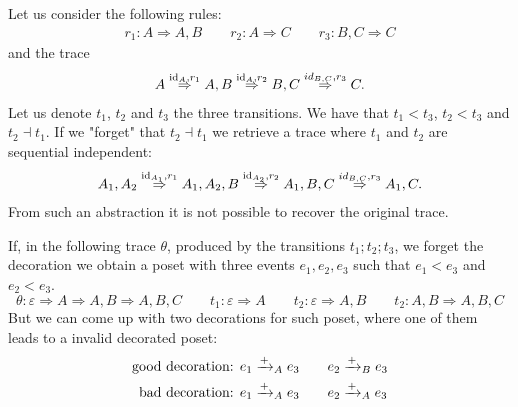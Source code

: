 \begin{example}
  Let us consider the following rules:
  \begin{align*}
    r_1:A \Rightarrow A, B\qquad r_2:A \Rightarrow C \qquad r_3: B,C \Rightarrow C
  \end{align*}
  and the trace
  \begin{align*}
    A \overset{\text{id}_A,r_1}{\Rightarrow} A, B \overset{\text{id}_A,r_2}{\Rightarrow} B,C \overset{id_{B,C},r_3}{\Rightarrow}C.
  \end{align*}
  Let us denote $t_1$, $t_2$ and $t_3$ the three transitions. We have that $t_1<t_3$, $t_2<t_3$ and $t_2\dashv t_1$. If we "forget" that $t_2\dashv t_1$ we retrieve a trace where $t_1$ and $t_2$ are sequential independent:
  \begin{align*}
    A_1,A_2 \overset{\text{id}_{A_1},r_1}{\Rightarrow} A_1,A_2,B \overset{\text{id}_{A_2},r_2}{\Rightarrow} A_1,B,C \overset{id_{B,C},r_3}{\Rightarrow} A_1,C.
  \end{align*}
  From such an abstraction it is not possible to recover the original trace.
\end{example}


\begin{example}
  If, in the following trace $\theta$, produced by the transitions $t_1;t_2;t_3$, we forget the decoration we obtain a poset with three events $e_1,e_2,e_3$ such that $e_1<e_3$ and $e_2<e_3$.
  \[
  \theta:\varepsilon \Rightarrow A \Rightarrow A,B\Rightarrow A,B,C\qquad t_1: \varepsilon \Rightarrow A\qquad t_2: \varepsilon\Rightarrow A,B\qquad t_2: A,B\Rightarrow A,B,C
  \]
  But we can come up with two decorations for such poset, where one of them leads to a invalid decorated poset:
  \begin{align*}
  \text{good decoration: }&e_1\mathrel{\xrightarrow{+}}_A e_3\qquad e_2\mathrel{\xrightarrow{+}}_B e_3\\
  \text{bad decoration: }&e_1\mathrel{\xrightarrow{+}}_A e_3\qquad e_2\mathrel{\xrightarrow{+}}_A e_3
  \end{align*}
\end{example}

